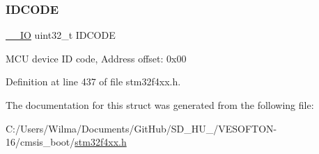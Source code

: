 \subsubsection{\texorpdfstring{I\+D\+C\+O\+DE}{IDCODE}}
{\footnotesize\ttfamily \hyperlink{group___c_m_s_i_s__core__definitions_gaec43007d9998a0a0e01faede4133d6be}{\+\_\+\+\_\+\+IO} uint32\+\_\+t I\+D\+C\+O\+DE}

M\+CU device ID code, Address offset\+: 0x00 

Definition at line 437 of file stm32f4xx.\+h.



The documentation for this struct was generated from the following file\+:\begin{DoxyCompactItemize}
\item 
C\+:/\+Users/\+Wilma/\+Documents/\+Git\+Hub/\+S\+D\+\_\+\+H\+U\+\_/\+V\+E\+S\+O\+F\+T\+O\+N-\/16/cmsis\+\_\+boot/\hyperlink{stm32f4xx_8h}{stm32f4xx.\+h}\end{DoxyCompactItemize}
